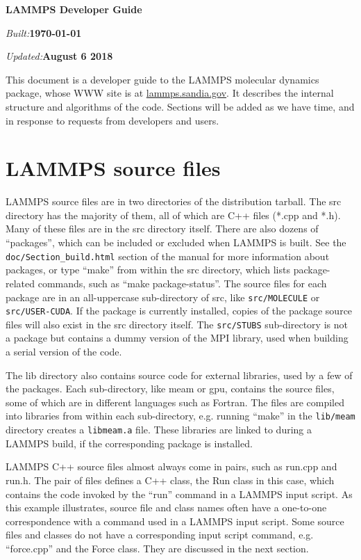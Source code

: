 \documentclass{article}
\newcommand{\path}[1]{\colorbox{light-gray}{\texttt{#1}}}
\begin{document}
\centerline{\Large \bf LAMMPS Developer Guide}
\centerline{\emph{Built:}\bf \today}
\centerline{\emph{Updated:}\bf August 6 2018}

\vspace{0.5in}

This document is a developer guide to the LAMMPS molecular dynamics
package, whose WWW site is at \url{lammps.sandia.gov}.  It describes the
internal structure and algorithms of the code.  Sections will be added
as we have time, and in response to requests from developers and
users.

\tableofcontents
\renewcommand\listoflistingscaption{List of source codes}
\listoflistings

\pagebreak
\section{LAMMPS source files}

LAMMPS source files are in two directories of the distribution
tarball.  The src directory has the majority of them, all of which are
C++ files (*.cpp and *.h).  Many of these files are in the src
directory itself.  There are also dozens of ``packages'', which can be
included or excluded when LAMMPS is built.  See the
\path{doc/Section\_build.html} section of the manual for more information
about packages, or type ``make'' from within the src directory, which
lists package-related commands, such as ``make package-status''.  The
source files for each package are in an all-uppercase sub-directory of
src, like \path{src/MOLECULE} or \path{src/USER-CUDA}. If the package is currently
installed, copies of the package source files will also exist in the
src directory itself.  The \path{src/STUBS} sub-directory is not a package
but contains a dummy version of the MPI library, used when building a
serial version of the code.

The lib directory also contains source code for external libraries,
used by a few of the packages.  Each sub-directory, like meam or gpu,
contains the source files, some of which are in different languages
such as Fortran.  The files are compiled into libraries from within
each sub-directory, e.g. running ``make'' in the \path{lib/meam} directory
creates a \path{libmeam.a} file.  These libraries are linked to during a
LAMMPS build, if the corresponding package is installed.

LAMMPS C++ source files almost always come in pairs, such as run.cpp
and run.h.  The pair of files defines a C++ class, the Run class in
this case, which contains the code invoked by the ``run'' command in a
LAMMPS input script.  As this example illustrates, source file and
class names often have a one-to-one correspondence with a command used
in a LAMMPS input script.  Some source files and classes do not have a
corresponding input script command, e.g. ``force.cpp'' and the Force
class.  They are discussed in the next section.
\end{document}
